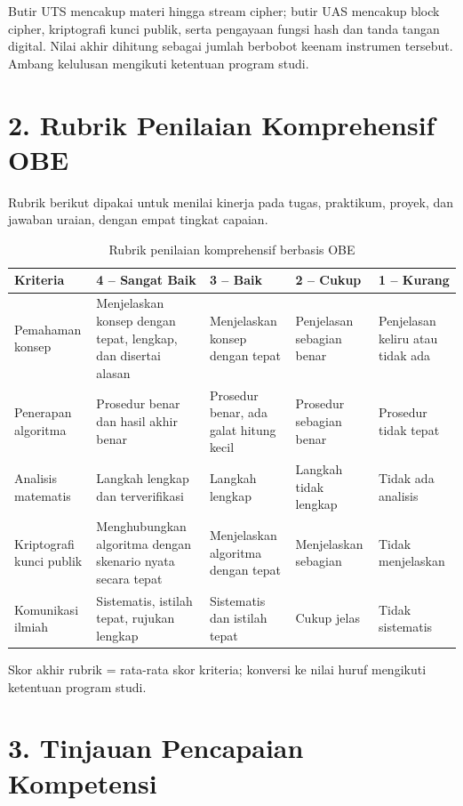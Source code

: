 \documentclass[../main.tex]{subfiles}
\begin{document}
Butir UTS mencakup materi hingga stream cipher; butir UAS mencakup block cipher,
kriptografi kunci publik, serta pengayaan fungsi hash dan tanda tangan digital.
Nilai akhir dihitung sebagai jumlah berbobot keenam instrumen tersebut. Ambang
kelulusan mengikuti ketentuan program studi.

\section*{2. Rubrik Penilaian Komprehensif OBE}

Rubrik berikut dipakai untuk menilai kinerja pada tugas, praktikum, proyek,
dan jawaban uraian, dengan empat tingkat capaian.

\begin{table}[H]
\centering
\caption{Rubrik penilaian komprehensif berbasis OBE}
\label{tab:rubrik-komprehensif}
\footnotesize
\begin{tabularx}{\linewidth}{|>{\raggedright\arraybackslash}p{2.4cm}|>{\raggedright\arraybackslash}X|>{\raggedright\arraybackslash}X|>{\raggedright\arraybackslash}X|>{\raggedright\arraybackslash}X|}
\hline
\textbf{Kriteria} & \textbf{4 -- Sangat Baik} & \textbf{3 -- Baik} & \textbf{2 -- Cukup} & \textbf{1 -- Kurang} \\
\hline
Pemahaman konsep & Menjelaskan konsep dengan tepat, lengkap, dan disertai alasan & Menjelaskan konsep dengan tepat & Penjelasan sebagian benar & Penjelasan keliru atau tidak ada \\
\hline
Penerapan algoritma & Prosedur benar dan hasil akhir benar & Prosedur benar, ada galat hitung kecil & Prosedur sebagian benar & Prosedur tidak tepat \\
\hline
Analisis matematis & Langkah lengkap dan terverifikasi & Langkah lengkap & Langkah tidak lengkap & Tidak ada analisis \\
\hline
Kriptografi kunci publik & Menghubungkan algoritma dengan skenario nyata secara tepat & Menjelaskan algoritma dengan tepat & Menjelaskan sebagian & Tidak menjelaskan \\
\hline
Komunikasi ilmiah & Sistematis, istilah tepat, rujukan lengkap & Sistematis dan istilah tepat & Cukup jelas & Tidak sistematis \\
\hline
\end{tabularx}
\end{table}

Skor akhir rubrik = rata-rata skor kriteria; konversi ke nilai huruf mengikuti
ketentuan program studi.

\section*{3. Tinjauan Pencapaian Kompetensi}
\end{document}
